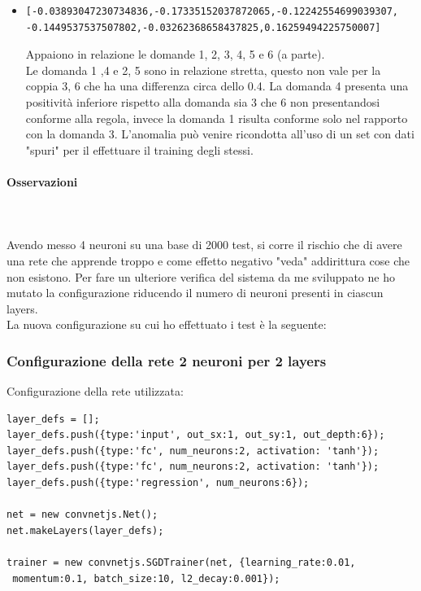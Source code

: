 \begin{itemize}
\item  \begin{verbatim}[-0.03893047230734836,-0.17335152037872065,-0.12242554699039307,
-0.1449537537507802,-0.03262368658437825,0.16259494225750007]\end{verbatim}
Appaiono in relazione le domande 1, 2, 3, 4, 5  e 6 (a parte).\\
Le domanda 1 ,4 e 2, 5  sono in relazione stretta, questo non vale per la coppia 3, 6 che ha una differenza circa dello 0.4. La domanda 4 presenta una positivit\`a inferiore rispetto alla domanda sia 3 che 6 non presentandosi conforme alla regola, invece la domanda 1 risulta conforme solo nel rapporto con la domanda 3. L'anomalia pu\`o venire ricondotta all'uso di un set con dati "spuri" per il effettuare il training degli stessi.
\end{itemize}

\paragraph{Osservazioni}\mbox{}
\label{Osservazioni su rete a 4 neuroni}
\\\\
\noindent
Avendo messo 4 neuroni su una base di 2000 test, si corre il rischio che di avere una rete che apprende troppo e come effetto negativo "veda" addirittura cose che non esistono.
Per fare un ulteriore verifica del sistema da me sviluppato ne ho mutato la configurazione riducendo il numero di neuroni presenti in ciascun layers.\\
La nuova configurazione su cui ho effettuato i test \`e la seguente:

\subsubsection{Configurazione della rete 2 neuroni per 2 layers}
\label{Configurazione della rete 2 neuroni per 2 layers}
Configurazione della rete utilizzata:\\
\begin{verbatim}layer_defs = [];
layer_defs.push({type:'input', out_sx:1, out_sy:1, out_depth:6});
layer_defs.push({type:'fc', num_neurons:2, activation: 'tanh'});
layer_defs.push({type:'fc', num_neurons:2, activation: 'tanh'});
layer_defs.push({type:'regression', num_neurons:6});

net = new convnetjs.Net();
net.makeLayers(layer_defs);

trainer = new convnetjs.SGDTrainer(net, {learning_rate:0.01,
 momentum:0.1, batch_size:10, l2_decay:0.001});
\end{verbatim}

